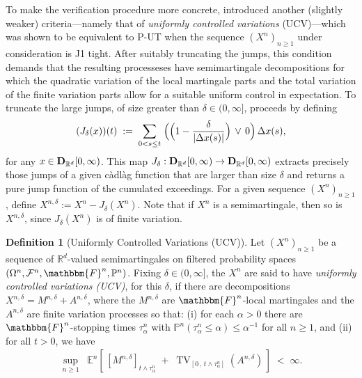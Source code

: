 \documentclass[11pt]{article}
\theoremstyle{definition}\newtheorem{example}[theorem]{Example}
\theoremstyle{definition}\newtheorem{counterexample}[theorem]{Counterexample}
\theoremstyle{definition}\newtheorem{remark}[theorem]{Remark}
\theoremstyle{definition}\newtheorem{defi}[theorem]{Definition}
\numberwithin{equation}{section}
\newcommand{\R}{\mathbb{R}}
\newcommand{\D}{{\bf D}}											%
\newcommand{\E}{\mathbb{E}}											%
\newcommand{\Pro}{\mathbb{P}}										%
\renewcommand{\sup}[1]{\underset{#1}{\operatorname{sup}}\;}					%
\renewcommand{\|}{\; : \, \;}											%
\begin{document}
To make the verification procedure more concrete, \cite{kurtzprotter} introduced another (slightly weaker) criteria---namely that of \emph{uniformly controlled variations} (UCV)---which was shown to be equivalent to P-UT when the sequence $(X^n)_{n\ge 1}$ under consideration is J1 tight. After suitably truncating the jumps, this condition demands that the resulting processeses have semimartingale decompositions for which the quadratic variation of the local martingale parts and the total variation of the finite variation parts allow for a suitable uniform control in expectation. To truncate the large jumps, of size greater than  $\delta \in (0,\infty]$, \cite{kurtzprotter} proceeds  by defining
$$ (J_\delta(x))(t) \; := \; \sum_{0 < s \le t} \; \Bigl( \Bigl(1- \frac{\delta}{|\Delta x(s)|}\Bigr) \, \vee \, 0 \Bigr) \, \Delta x(s), $$
for any $x \in \D_{\R^d}[0,\infty)$. This map $J_\delta: \D_{\R^d}[0,\infty) \to \D_{\R^d}[0,\infty)$ extracts precisely those jumps of a given càdlàg function that are larger than size $\delta$ and returns a pure jump function of the cumulated exceedings. For a given sequence $(X^n)_{n\geq 1}$, define $X^{n,\delta}:= X^n - J_\delta(X^n)$. Note that if $X^n$ is a semimartingale, then so is $X^{n,\delta}$, since $J_\delta(X^n)$ is of finite variation.
\begin{defi}[Uniformly Controlled Variations (UCV)]\label{defn:UCV} 
	Let $(X^n)_{n\ge 1}$ be a sequence of $\R^d$-valued semimartingales on filtered probability spaces $(\Omega^n, \mathcal{F}^n, \mathbbm{F}^n, \Pro^n)$. Fixing $\delta \in (0,\infty]$, the $X^n$ are said to have \emph{uniformly controlled variations (UCV)}, for this $\delta$, if there are decompositions $X^{n, \delta}= M^{n, \delta} + A^{n,\delta}$, where the $M^{n, \delta}$ are $\mathbbm{F}^n$-local martingales and the $A^{n,\delta}$ are finite variation processes so that: (i) for each $\alpha>0$ there are $\mathbbm{F}^n$-stopping times $\tau_\alpha^{n}$ with $\Pro^n \left( \tau_\alpha^{n} \le \alpha\right) \le \alpha^{-1}$ for all $n\ge 1$, and (ii) for all $t>0$, we have
	\begin{align}
		\sup{n\ge 1} \; \E^n \left[ \, [ M^{n,\delta} ]_{t\wedge \tau_\alpha^{n}} \; + \; \operatorname{TV}_{[0\, , \, t\wedge \tau_\alpha^{n}]}(A^{n,\delta}) \, \right] \; < \; \infty.  \label{eq:UCV} 
	\end{align}
\end{defi}
\end{document}
